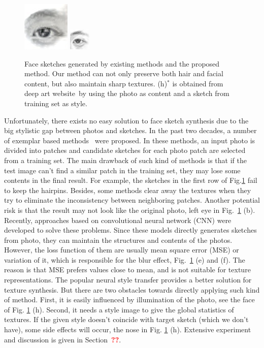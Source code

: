 \documentclass[10pt,twocolumn,letterpaper]{article}
\def\red[#1]{\textcolor{red}{\textbf{#1}}}
\begin{document}
\begin{figure}[t]
\begin{minipage}[t]{1\linewidth}
\includegraphics[width=0.11\linewidth]{img/eye_deepart.jpg}
\includegraphics[width=0.11\linewidth]{img/eye_ours.png}
\end{minipage}
\caption[Caption for LOF]{Face sketches generated by existing methods and the proposed method. Our method can not only preserve both hair and facial content, but also maintain sharp textures. \setcounter{footnote}{0} (h)$^*$ is obtained from deep art website\footnotemark~by using the photo as content and a sketch from training set as style.}
\label{fig:example_comp}
\end{figure}

Unfortunately, there exists no easy solution to face sketch synthesis due to the big stylistic gap between photos and sketches. In the past two decades, a number of exemplar based methods~\cite{wang2009face,song2014real, zhang2010lighting,zhou2012markov} were proposed. In these methods, an input photo is divided into patches and candidate sketches for each photo patch are selected from a training set. The main drawback of such kind of methods is that if the test image can't find a similar patch in the training set, they may lose some contents in the final result. For example, the sketches in the first row of Fig.\ref{fig:example_comp} fail to keep the hairpins. Besides, some methods \cite{song2014real,zhou2012markov} clear away the textures when they try to eliminate the inconsistency between neighboring patches. Another potential risk is that the result may not look like the original photo, \eg left eye in Fig.~\ref{fig:example_comp} (b). Recently, approaches \cite{zhang2017content,zhang2015end} based on convolutional neural network (CNN) were developed to solve these problems. Since these models directly generates sketches from photo, they can maintain the structures and contents of the photos. However, the loss function of them are usually mean square error (MSE) or variation of it, which is responsible for the blur effect, \eg Fig.~\ref{fig:example_comp} (e) and (f). The reason is that MSE prefers values close to mean, and is not suitable for texture representations. The popular neural style transfer provides a better solution for texture synthesis. But there are two obstacles towards directly applying such kind of method. First, it is easily influenced by illumination of the photo, see the face of Fig. \ref{fig:example_comp} (h). Second, it needs a style image to give the global statistics of textures. If the given style doesn't coincide with target sketch (which we don't have), some side effects will occur, \eg the nose in Fig. \ref{fig:example_comp} (h). Extensive experiment and discussion is given in Section~\red[??]. 
\end{document}
